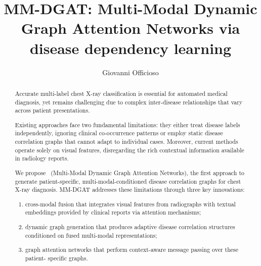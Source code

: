 \documentclass[
  journal=noname,
  manuscript=draft,
  year=,
  volume=,
]{cup-journal}
\title{MM-DGAT: Multi-Modal Dynamic Graph Attention Networks via disease dependency learning}
\author{Giovanni Officioso}
\affiliation{University of Milán-Bicocca, DEMS, Milán, Italy}
\begin{document}
\begin{abstract}

Accurate multi-label chest X-ray classification is essential for automated medical diagnosis, yet remains challenging due to complex inter-disease relationships that vary across patient presentations. 

Existing approaches face two fundamental limitations: they either treat disease labels independently, ignoring clinical co-occurrence patterns or employ static disease correlation graphs that cannot adapt to individual cases. Moreover, current methods operate solely on visual features, disregarding the rich contextual information available in radiology reports. 

We propose \textbf{\mm}\, (Multi-Modal Dynamic Graph Attention  Networks), the first approach to generate patient-specific, multi-modal-conditioned disease correlation graphs for chest X-ray  diagnosis. MM-DGAT addresses these limitations through three key innovations:
\begin{enumerate}
    \item cross-modal fusion that integrates visual features from radiographs with textual embeddings provided by clinical reports via attention mechanisms;
    \item dynamic graph generation that produces  adaptive disease correlation structures conditioned on fused  multi-modal representations; 
    \item graph attention networks that perform context-aware message passing over these patient- specific graphs. 
\end{enumerate}

\end{abstract}
\end{document}

